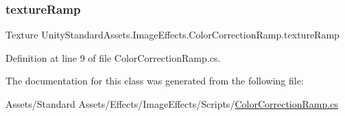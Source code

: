 \subsubsection{\texorpdfstring{texture\+Ramp}{textureRamp}}
{\footnotesize\ttfamily Texture Unity\+Standard\+Assets.\+Image\+Effects.\+Color\+Correction\+Ramp.\+texture\+Ramp}



Definition at line 9 of file Color\+Correction\+Ramp.\+cs.



The documentation for this class was generated from the following file\+:\begin{DoxyCompactItemize}
\item 
Assets/\+Standard Assets/\+Effects/\+Image\+Effects/\+Scripts/\mbox{\hyperlink{_color_correction_ramp_8cs}{Color\+Correction\+Ramp.\+cs}}\end{DoxyCompactItemize}
